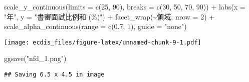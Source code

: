 \documentclass[
]{article}
\newenvironment{Shaded}{\begin{snugshade}}{\end{snugshade}}
\newcommand{\AttributeTok}[1]{\textcolor[rgb]{0.77,0.63,0.00}{#1}}
\newcommand{\DecValTok}[1]{\textcolor[rgb]{0.00,0.00,0.81}{#1}}
\newcommand{\FloatTok}[1]{\textcolor[rgb]{0.00,0.00,0.81}{#1}}
\newcommand{\FunctionTok}[1]{\textcolor[rgb]{0.00,0.00,0.00}{#1}}
\newcommand{\NormalTok}[1]{#1}
\newcommand{\SpecialCharTok}[1]{\textcolor[rgb]{0.00,0.00,0.00}{#1}}
\newcommand{\StringTok}[1]{\textcolor[rgb]{0.31,0.60,0.02}{#1}}
\begin{document}
\begin{Shaded}
\begin{Highlighting}[]
  \FunctionTok{scale\_y\_continuous}\NormalTok{(}\AttributeTok{limits =} \FunctionTok{c}\NormalTok{(}\DecValTok{25}\NormalTok{, }\DecValTok{90}\NormalTok{), }\AttributeTok{breaks =} \FunctionTok{c}\NormalTok{(}\DecValTok{30}\NormalTok{, }\DecValTok{50}\NormalTok{, }\DecValTok{70}\NormalTok{, }\DecValTok{90}\NormalTok{)) }\SpecialCharTok{+}
  \FunctionTok{labs}\NormalTok{(}\AttributeTok{x =} \StringTok{"年"}\NormalTok{, }\AttributeTok{y =} \StringTok{"書審面試比例和 (\%)"}\NormalTok{) }\SpecialCharTok{+}
  \FunctionTok{facet\_wrap}\NormalTok{(}\SpecialCharTok{\textasciitilde{}}\NormalTok{領域, }\AttributeTok{nrow =} \DecValTok{2}\NormalTok{) }\SpecialCharTok{+}
  \FunctionTok{scale\_alpha\_continuous}\NormalTok{(}\AttributeTok{range =} \FunctionTok{c}\NormalTok{(}\FloatTok{0.7}\NormalTok{, }\DecValTok{1}\NormalTok{), }\AttributeTok{guide =} \StringTok{"none"}\NormalTok{)}
\end{Highlighting}
\end{Shaded}

\texttt{[image: ecdis\_files/figure-latex/unnamed-chunk-9-1.pdf]}

\begin{Shaded}
\begin{Highlighting}[]
\FunctionTok{ggsave}\NormalTok{(}\StringTok{"nfd\_1.png"}\NormalTok{)}
\end{Highlighting}
\end{Shaded}

\begin{verbatim}
## Saving 6.5 x 4.5 in image
\end{verbatim}
\end{document}
